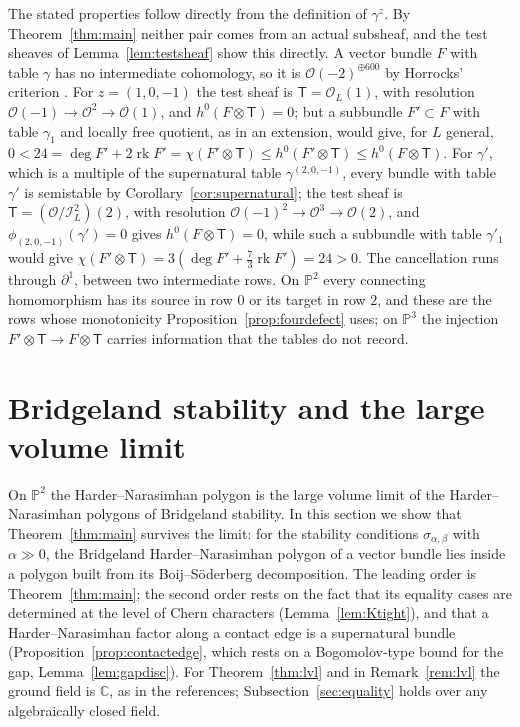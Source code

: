 \documentclass[11pt]{amsart}
\theoremstyle{definition}
\theoremstyle{remark}
\newcommand{\PP}{\mathbb{P}}
\newcommand{\OO}{\mathcal{O}}
\newcommand{\cI}{\mathcal{I}}
\newcommand{\Tt}{\mathsf{T}}
\DeclareMathOperator{\rk}{rk}
\begin{document}
The stated properties follow directly from the definition of $\gamma^z$. By Theorem~\ref{thm:main} neither pair comes from an actual subsheaf, and the test sheaves of Lemma~\ref{lem:testsheaf} show this directly. A vector bundle $F$ with table $\gamma$ has no intermediate cohomology, so it is $\OO(-2)^{\oplus600}$ by Horrocks' criterion \cite{Ho64}. For $z=(1,0,-1)$ the test sheaf is $\Tt=\OO_L(1)$, with resolution $\OO(-1)\to\OO^2\to\OO(1)$, and $h^0(F\otimes \Tt)=0$; but a subbundle $F'\subset F$ with table $\gamma_1$ and locally free quotient, as in an extension, would give, for $L$ general, $0<24=\deg F'+2\rk F'=\chi(F'\otimes\Tt)\le h^0(F'\otimes\Tt)\le h^0(F\otimes\Tt)$. For $\gamma'$, which is a multiple of the supernatural table $\gamma^{(2,0,-1)}$, every bundle with table $\gamma'$ is semistable by Corollary~\ref{cor:supernatural}; the test sheaf is $\Tt=(\OO/\cI_L^2)(2)$, with resolution $\OO(-1)^2\to\OO^3\to\OO(2)$, and $\phi_{(2,0,-1)}(\gamma')=0$ gives $h^0(F\otimes \Tt)=0$, while such a subbundle with table $\gamma'_1$ would give $\chi(F'\otimes\Tt)=3(\deg F'+\frac73\rk F')=24>0$. The cancellation runs through $\partial^1$, between two intermediate rows. On $\PP^2$ every connecting homomorphism has its source in row $0$ or its target in row $2$, and these are the rows whose monotonicity Proposition~\ref{prop:fourdefect} uses; on $\PP^3$ the injection $F'\otimes \Tt\to F\otimes \Tt$ carries information that the tables do not record.

\section{Bridgeland stability and the large volume limit}\label{sec:lvl}

On $\PP^2$ the Harder--Narasimhan polygon is the large volume limit of the Harder--Narasimhan polygons of Bridgeland stability. In this section we show that Theorem~\ref{thm:main} survives the limit: for the stability conditions $\sigma_{\alpha,\beta}$ with $\alpha\gg0$, the Bridgeland Harder--Narasimhan polygon of a vector bundle lies inside a polygon built from its Boij--Söderberg decomposition. The leading order is Theorem~\ref{thm:main}; the second order rests on the fact that its equality cases are determined at the level of Chern characters (Lemma~\ref{lem:Ktight}), and that a Harder--Narasimhan factor along a contact edge is a supernatural bundle (Proposition~\ref{prop:contactedge}, which rests on a Bogomolov-type bound for the gap, Lemma~\ref{lem:gapdisc}). For Theorem~\ref{thm:lvl} and in Remark~\ref{rem:lvl} the ground field is $\mathbb C$, as in the references; Subsection~\ref{sec:equality} holds over any algebraically closed field.
\end{document}
